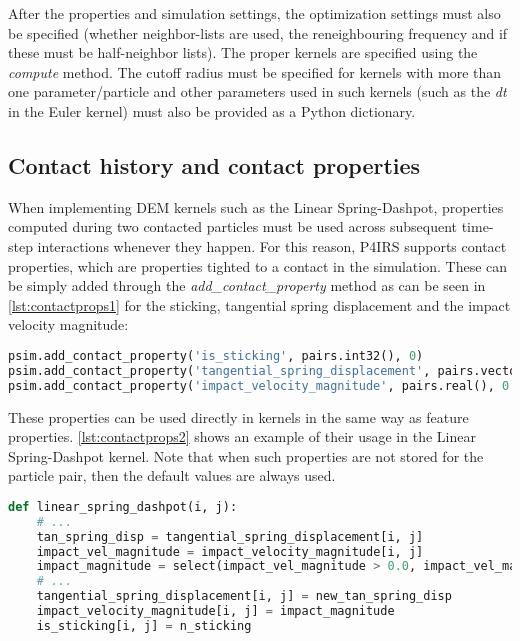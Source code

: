 \documentclass[preprint,12pt]{elsarticle}
\begin{document}
After the properties and simulation settings, the optimization settings must also be specified (whether neighbor-lists are used, the reneighbouring frequency and if these must be half-neighbor lists).
The proper kernels are specified using the \emph{compute} method. The cutoff radius must be specified for kernels with more than one parameter/particle and other parameters used in such kernels (such as the \emph{dt} in the Euler kernel) must also be provided as a Python dictionary.


\subsection{Contact history and contact properties}
\label{sec:contact_history}

When implementing DEM kernels such as the Linear Spring-Dashpot, properties computed during two contacted particles must be used across subsequent time-step interactions whenever they happen.
For this reason, P4IRS supports contact properties, which are properties tighted to a contact in the simulation.
These can be simply added through the \emph{add\_contact\_property} method as can be seen in \autoref{lst:contactprops1} for the sticking, tangential spring displacement and the impact velocity magnitude:

\begin{lstlisting}[language=Python,
		   label={lst:contactprops1},
		   caption={Setup example for contact properties.}]
psim.add_contact_property('is_sticking', pairs.int32(), 0)
psim.add_contact_property('tangential_spring_displacement', pairs.vector(), [0.0, 0.0, 0.0])
psim.add_contact_property('impact_velocity_magnitude', pairs.real(), 0.0)
\end{lstlisting}

These properties can be used directly in kernels in the same way as feature properties.
\autoref{lst:contactprops2} shows an example of their usage in the Linear Spring-Dashpot kernel.
Note that when such properties are not stored for the particle pair, then the default values are always used.

\begin{lstlisting}[language=Python,
		   label={lst:contactprops2},
		   caption={Setup example for contact properties.}]
def linear_spring_dashpot(i, j):
    # ...
    tan_spring_disp = tangential_spring_displacement[i, j]
    impact_vel_magnitude = impact_velocity_magnitude[i, j]
    impact_magnitude = select(impact_vel_magnitude > 0.0, impact_vel_magnitude, length(rel_vel))
    # ...
    tangential_spring_displacement[i, j] = new_tan_spring_disp
    impact_velocity_magnitude[i, j] = impact_magnitude
    is_sticking[i, j] = n_sticking
\end{lstlisting}
\end{document}
